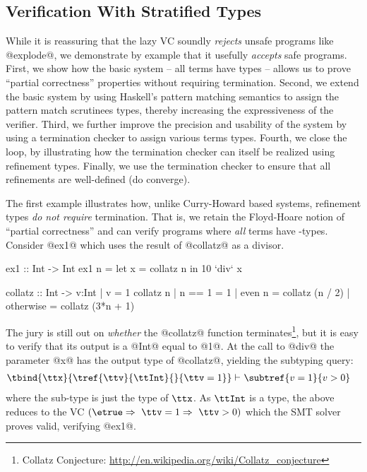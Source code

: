 \subsection{Verification With Stratified Types}\label{sec:overview:examples}
While it is reassuring that the lazy VC soundly \emph{rejects} 
unsafe programs like @explode@, we demonstrate by example
that it usefully \emph{accepts} safe programs.
% 
First, we show how the basic system -- all terms
have \Div types -- allows us to prove ``partial correctness''
properties without requiring termination.
%
Second, we extend the basic system by 
using Haskell's pattern matching semantics to assign 
the pattern match scrutinees \Wnf types, thereby 
increasing the expressiveness of the verifier.
%
Third, we further improve the precision 
and usability of the system by using a termination 
checker to assign various terms \Fin types.
%
Fourth, we close the loop, by illustrating how the 
termination checker can itself be realized using 
refinement types.
%
Finally, we use the termination checker to ensure that
all refinements are well-defined (\ie do converge).

The first example illustrates how, unlike Curry-Howard based
systems, refinement types \emph{do not require} termination. 
%
That is, we retain the Floyd-Hoare notion of ``partial correctness''
and can verify programs where \emph{all} terms have \Div-types.
%
Consider @ex1@ which uses the result of @collatz@ as a divisor.
%
\begin{code}
  ex1   :: Int -> Int 
  ex1 n = let x = collatz n in 10 `div` x 

  collatz :: Int -> {v:Int | v = 1}
  collatz n 
    | n == 1    = 1 
    | even n    = collatz (n / 2)
    | otherwise = collatz (3*n + 1)
\end{code}
%
The jury is still out on \emph{whether} the @collatz@ 
function terminates\footnote{
Collatz Conjecture: \url{http://en.wikipedia.org/wiki/Collatz\_conjecture}}, 
but it is easy
to verify that its output is a \Div @Int@ equal to @1@.
%
At the call to @div@ the parameter @x@ has the output type 
of @collatz@, yielding the subtyping query:
%
\begin{align*}
   \tbind{\ttx}{\tref{\ttv}{\ttInt}{}{\ttv=1}} \vdash\ & \subtref{v = 1}{v > 0} 
\end{align*}
% 
where the sub-type is just the type of $\ttx$. 
As $\ttInt$ is a \Div type, the above reduces to the VC 
${(\etrue \Rightarrow\  \ttv = 1 \Rightarrow\ \ttv > 0)}$
which the SMT solver proves valid, verifying @ex1@.

